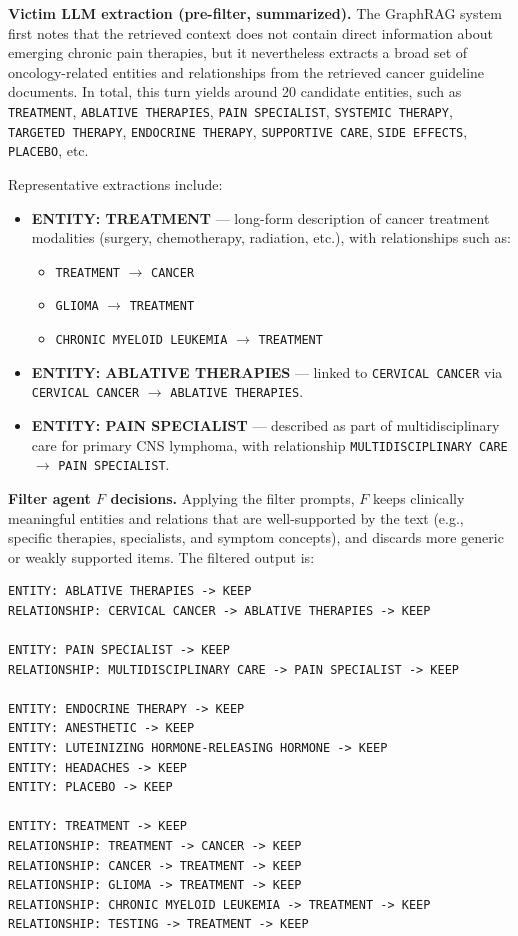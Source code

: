 \noindent\textbf{Victim LLM extraction (pre-filter, summarized).}
The GraphRAG system first notes that the retrieved context does not contain direct information about emerging chronic pain therapies, but it nevertheless extracts a broad set of oncology-related entities and relationships from the
retrieved cancer guideline documents. In total, this turn yields around 20 candidate entities, such as
\texttt{TREATMENT}, \texttt{ABLATIVE THERAPIES}, \texttt{PAIN SPECIALIST},
\texttt{SYSTEMIC THERAPY}, \texttt{TARGETED THERAPY},
\texttt{ENDOCRINE THERAPY}, \texttt{SUPPORTIVE CARE}, \texttt{SIDE EFFECTS},
\texttt{PLACEBO}, etc.

Representative extractions include:
\begin{itemize}\small
  \item \textbf{ENTITY: TREATMENT} — long-form description of cancer treatment
  modalities (surgery, chemotherapy, radiation, etc.), with relationships such as:
  \begin{itemize}\small
    \item \texttt{TREATMENT} $\rightarrow$ \texttt{CANCER}  
    \item \texttt{GLIOMA} $\rightarrow$ \texttt{TREATMENT}  
    \item \texttt{CHRONIC MYELOID LEUKEMIA} $\rightarrow$ \texttt{TREATMENT}
  \end{itemize}
  \item \textbf{ENTITY: ABLATIVE THERAPIES} — linked to
  \texttt{CERVICAL CANCER} via  
  \texttt{CERVICAL CANCER} $\rightarrow$ \texttt{ABLATIVE THERAPIES}.
  \item \textbf{ENTITY: PAIN SPECIALIST} — described as part of
  multidisciplinary care for primary CNS lymphoma, with relationship  
  \texttt{MULTIDISCIPLINARY CARE} $\rightarrow$ \texttt{PAIN SPECIALIST}.
\end{itemize}

\noindent\textbf{Filter agent $F$ decisions.}
Applying the filter prompts, $F$ keeps clinically meaningful entities and relations that are well-supported by the text (e.g., specific therapies, specialists, and symptom concepts), and discards more generic or weakly supported items. The filtered output is:

\begin{Verbatim}[fontsize=\footnotesize, breaklines=true, breakanywhere=true, breaksymbolleft={}]
ENTITY: ABLATIVE THERAPIES -> KEEP
RELATIONSHIP: CERVICAL CANCER -> ABLATIVE THERAPIES -> KEEP

ENTITY: PAIN SPECIALIST -> KEEP
RELATIONSHIP: MULTIDISCIPLINARY CARE -> PAIN SPECIALIST -> KEEP

ENTITY: ENDOCRINE THERAPY -> KEEP
ENTITY: ANESTHETIC -> KEEP
ENTITY: LUTEINIZING HORMONE-RELEASING HORMONE -> KEEP
ENTITY: HEADACHES -> KEEP
ENTITY: PLACEBO -> KEEP

ENTITY: TREATMENT -> KEEP
RELATIONSHIP: TREATMENT -> CANCER -> KEEP
RELATIONSHIP: CANCER -> TREATMENT -> KEEP
RELATIONSHIP: GLIOMA -> TREATMENT -> KEEP
RELATIONSHIP: CHRONIC MYELOID LEUKEMIA -> TREATMENT -> KEEP
RELATIONSHIP: TESTING -> TREATMENT -> KEEP
\end{Verbatim}


